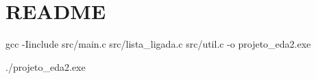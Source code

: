 \chapter{README}
\hypertarget{md__r_e_a_d_m_e}{}\label{md__r_e_a_d_m_e}
gcc -\/Iinclude src/main.\+c src/lista\+\_\+ligada.\+c src/util.\+c -\/o projeto\+\_\+eda2.\+exe

./projeto\+\_\+eda2.exe 